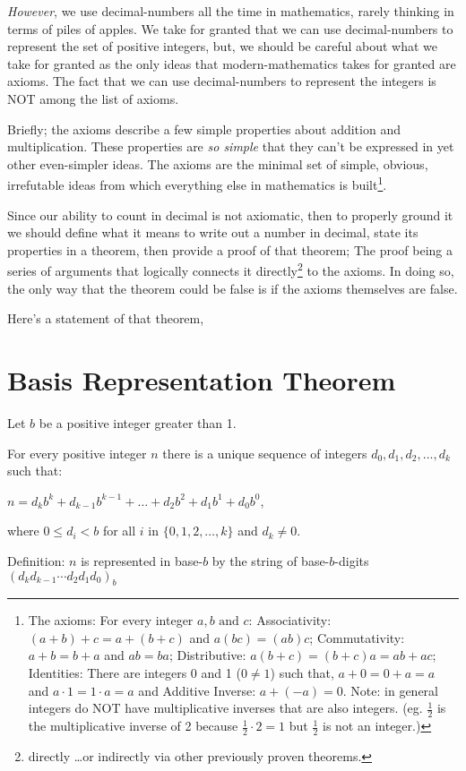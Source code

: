 \documentclass{article}
\newenvironment{jprIn}{\begin{adjustwidth}{2em}{}}{\end{adjustwidth}}
\begin{document}
\emph{However}, we use decimal-numbers all the time in mathematics,
rarely thinking in terms of piles of apples.
We take for granted
that we can use decimal-numbers to represent the set of positive integers,
but, we should be careful about what we take for granted as the 
only ideas that modern-mathematics
takes for granted are axioms.
The fact that we can use decimal-numbers to represent the integers is NOT among the list of axioms.

Briefly; the axioms describe a few simple properties about addition and multiplication.
These properties are \emph{so simple} that they can't be expressed in
yet other even-simpler ideas. The axioms are the minimal set of simple,
obvious, irrefutable ideas from which
everything else in mathematics is built\footnote{The axioms:
For every integer $a,b\text{ and }c$:
Associativity: $(a+b)+c=a+(b+c)$ and $a(bc)=(ab)c$;
Commutativity: $a+b=b+a$ and $ab=ba$;
Distributive: $a(b+c)=(b+c)a=ab+ac$;
Identities: There are integers 0 and 1 ($0\ne1$) such that,
$a+0=0+a=a$ and $a\cdot{}1=1\cdot{}a=a$ and
Additive Inverse: $a+(-a)=0$.
Note: in general integers do NOT have multiplicative inverses 
that are also integers. (eg. $\frac{1}{2}$ is the multiplicative
inverse of 2 because $\frac{1}{2}\cdot{}2=1$ but $\frac{1}{2}$ is not an integer.)}.

Since our ability to count in decimal is not axiomatic, then to properly ground it we should
define what it means to write out a number in decimal,
state its properties in a theorem,
then provide a proof of that theorem;
The proof being
a series of arguments that logically connects it
directly\footnote{directly \dots{}or indirectly
via other previously proven theorems.} to the axioms. 
In doing so, the only way
that the theorem could be false is if the axioms themselves are false.

Here's a statement of that theorem,
\section*{Basis Representation Theorem}
\begin{jprIn}
Let $b$ be a positive integer greater than 1.

For every positive integer $n$ there is a unique sequence
of integers $d_0, d_1, d_2,\dots{},d_k$ such that:

\hspace{3em}$n=d_kb^k+d_{k-1}b^{k-1}+\dots+d_2b^2+d_1b^1+d_0b^0$,

where $0\le{}d_i<b$ for all $i$ in $\{0,1,2,\dots{},k\}$ and $d_k\ne0$.

Definition: $n$ is represented in base-$b$ by the string
of base-$b$-digits $(d_kd_{k-1}{\cdots}d_2d_1d_0)_b$
\end{jprIn}
\bigskip
\end{document}
